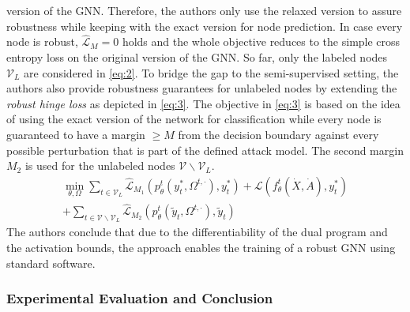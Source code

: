 \documentclass[a4paper,preprint]{sig-alternate}
\begin{document}
version of the GNN. \cite{Zuegner_2019}
Therefore, the authors only use the relaxed version to assure robustness while keeping with the exact version for node prediction.
In case every node is robust, $\mathcal{\hat{L}}_M = 0$ holds and the whole objective reduces to the simple cross entropy loss
on the original version of the GNN. \cite{Zuegner_2019}
So far, only the labeled nodes $\mathcal{V}_L$ are considered in \ref{eq:2}. To bridge the gap to the semi-supervised setting,
the authors also provide robustness guarantees for unlabeled nodes by extending the \textit{robust hinge loss} as depicted in \ref{eq:3}.
The objective in \ref{eq:3} is based on the idea of using the exact version of the network for classification while every node is guaranteed to have a margin
$\geq M$ from the decision boundary against every possible perturbation that is part of the defined attack model. \cite{Zuegner_2019}
The second margin $M_2$ is used for the unlabeled nodes $\mathcal{V} \backslash \mathcal{V}_L$.
\begin{multline}
\label{eq:3}
    \min_{\theta, \Omega} \sum_{t \in \mathcal{V}_L} \mathcal{\hat{L}}_{M_1} (p_{\theta}^t (y_t^{\ast}, \Omega^{t, \cdot}), y_t^{\ast}) + \mathcal{L} (f_{\theta}^t (\dot{X}, \dot{A}), y_t^{\ast}) \\
    + \sum_{t \in \mathcal{V} \backslash \mathcal{V}_L} \mathcal{\hat{L}}_{M_2} (p_{\theta}^t (\tilde{y}_t, \Omega^{t, \cdot}), \tilde{y}_t)
\end{multline}
The authors conclude that due to the differentiability of the dual program and the activation bounds,
the approach enables the training of a robust GNN using standard software.

\subsubsection{Experimental Evaluation and Conclusion}
\end{document}
